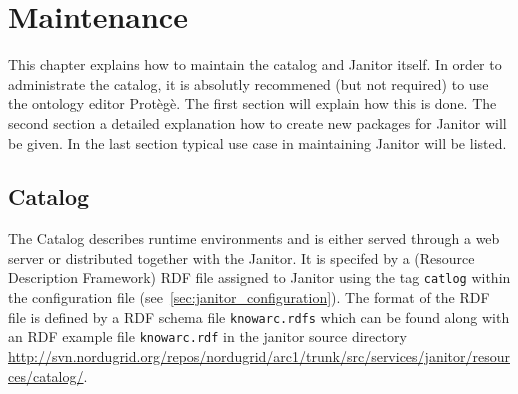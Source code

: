 \chapter{Maintenance}

This chapter explains how to maintain the catalog and Janitor itself. 
In order to administrate the catalog, it is absolutly recommened (but not required) to use the ontology editor Prot\`eg\`e. The first
section will explain how this is done.
The second section a detailed explanation how to create new packages for Janitor will be given.
In the last section typical use case in maintaining Janitor will be listed.


\section{Catalog}\label{sec:catalog}



The Catalog describes runtime environments and is either served through a web server or distributed together with the Janitor. 
It is specifed by a (Resource Description Framework) RDF file assigned to 
Janitor using the tag \texttt{catlog} within the configuration file (see~\ref{sec:janitor_configuration}). 
The format of the RDF file is defined by a RDF schema file \texttt{knowarc.rdfs}
which can be found along with an RDF example file \texttt{knowarc.rdf} in the janitor source directory \href{http://svn.nordugrid.org/repos/nordugrid/arc1/trunk/src/services/janitor/resources/catalog/}
{http://svn.nordugrid.org/repos/nordugrid/arc1/trunk/src/services/janitor/resources/catalog/}.\\


